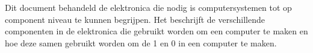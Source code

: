 Dit document behandeld de elektronica die nodig is computersystemen tot op component niveau te kunnen begrijpen. Het beschrijft de verschillende componenten in de elektronica die gebruikt worden om een computer te maken en hoe deze samen gebruikt worden om de 1 en 0 in een computer te maken.
